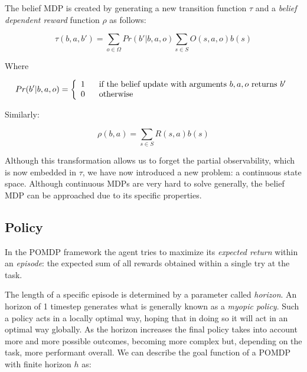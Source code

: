 The belief MDP is created by generating a new transition function $\tau$ and a \textit{belief
dependent reward} function $\rho$ as follows:

\begin{equation}
 \tau(b,a,b') = \sum_{o\in \Omega} Pr(b' | b, a, o) \sum_{s\in S} O(s,a,o) b(s)
\end{equation}

Where

\begin{equation}
Pr(b' | b, a, o) = \left\{
  \begin{array}{lr}
    1 \hspace{.6cm}\text{if the belief update with arguments $b,a,o$ returns $b'$}\\
    0 \hspace{.6cm}\text{otherwise}
  \end{array}
\right.
\end{equation}

Similarly:

\begin{equation}
 \rho(b,a) = \sum_{s\in S} R(s,a) b(s)
 \label{rhoeq}
\end{equation}

Although this transformation allows us to forget the partial observability, which is now embedded in
$\tau$, we have now introduced a new problem: a continuous state space. Although continuous MDPs are
very hard to solve generally, the belief MDP can be approached due to its specific properties.

\subsection{Policy}

In the POMDP framework the agent tries to maximize its \textit{expected return} within an
\textit{episode}: the expected sum of all rewards obtained within a single try at the task.

The length of a specific episode is determined by a parameter called \textit{horizon}. An horizon of
1 timestep generates what is generally known as a \textit{myopic policy}. Such a policy acts in a
locally optimal way, hoping that in doing so it will act in an optimal way globally. As the horizon
increases the final policy takes into account more and more possible outcomes, becoming more complex
but, depending on the task, more performant overall. We can describe the goal function of a POMDP
with finite horizon $h$ as:

